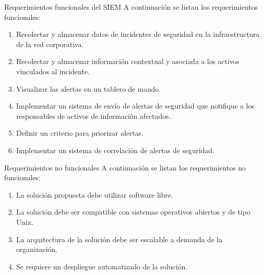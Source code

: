     \begin{section}{Requerimientos funcionales del SIEM}
    A continuación se listan los requerimientos funcionales:
    \begin{enumerate}
        \item Recolectar y almacenar datos de incidentes de seguridad en la infraestructura de la red corporativa.
        \item Recolectar y almacenar información contextual y asociada a los activos vinculados  al incidente.
        \item Visualizar las alertas en un tablero de mando. 
        \item Implementar un sistema de envío de alertas de seguridad que notifique a los responsables de activos de información afectados.
        \item Definir un criterio para priorizar alertas.
        \item Implementar un sistema de correlación de alertas de seguridad.
    \end{enumerate}
        
    \end{section}
    \pagebreak
    \begin{section}{Requerimientos no funcionales}
    A continuación se listan los requerimientos no funcionales:
    \begin{enumerate}
        \item La solución propuesta debe utilizar software libre.
        \item La solución debe ser compatible con sistemas operativos abiertos y de tipo Unix. 
        \item La arquitectura de la solución debe ser escalable a demanda de la organización.
        \item Se requiere un despliegue automatizado de la solución.
    \end{enumerate}

    \end{section}
